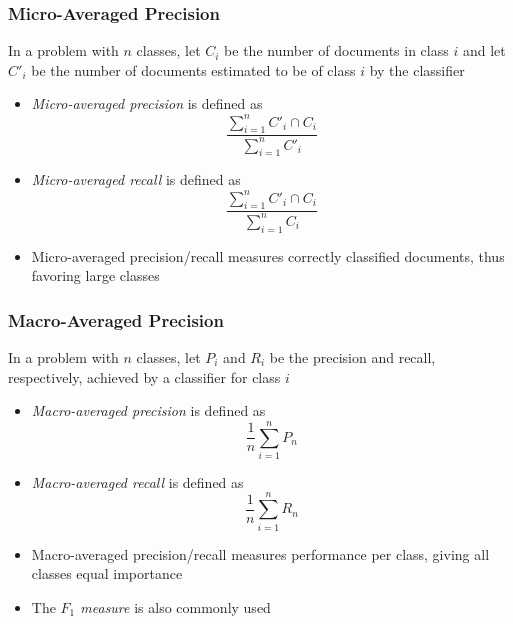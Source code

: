 \documentclass[svgnames]{beamer}
\begin{document}

\begin{frame} \frametitle{Micro-Averaged Precision}
  
 In a problem with $n$ classes, let $C_i$ be the number of documents in class
 $i$ and let $C'_i$ be the number of documents estimated to be of class $i$ by
 the classifier
 \begin{itemize}
 \item \emph{Micro-averaged precision} is defined as
   \begin{displaymath}
     \frac{\sum_{i=1}^n C'_i \cap C_i}{\sum_{i=1}^n C'_i}
   \end{displaymath}
 \item \emph{Micro-averaged recall} is defined as
   \begin{displaymath}
     \frac{\sum_{i=1}^n C'_i \cap C_i}{\sum_{i=1}^n C_i}
   \end{displaymath}
 \end{itemize}

 \begin{itemize}
 \item Micro-averaged precision/recall measures correctly classified
   documents, thus favoring large classes
 \end{itemize}
\end{frame}


\begin{frame} \frametitle{Macro-Averaged Precision}
  
 In a problem with $n$ classes, let $P_i$ and $R_i$ be the precision and
 recall, respectively, achieved by a classifier for class $i$
 \begin{itemize}
 \item \emph{Macro-averaged precision} is defined as
   \begin{displaymath}
     \frac{1}{n}\sum_{i=1}^n P_n
   \end{displaymath}
 \item \emph{Macro-averaged recall} is defined as
   \begin{displaymath}
     \frac{1}{n}\sum_{i=1}^n R_n
   \end{displaymath}
 \end{itemize}

 \begin{itemize}
 \item Macro-averaged precision/recall measures performance per class, giving
   all classes equal importance
\item The \emph{$F_1$ measure} is also commonly used
 \end{itemize}
\end{frame}
\end{document}
